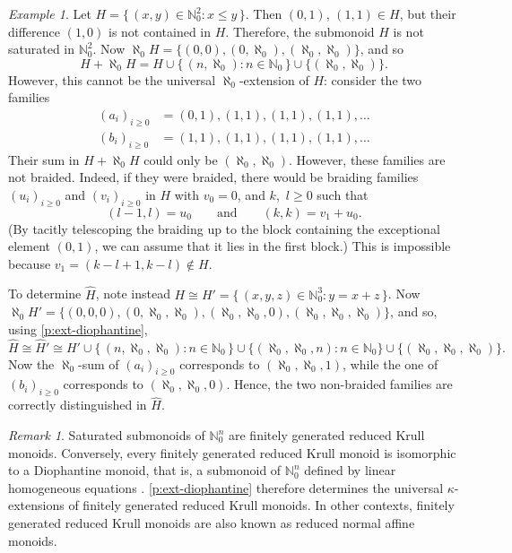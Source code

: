 \documentclass[a4paper,11pt,oneside]{amsart}
\theoremstyle{remark}
\newtheorem{remark}[teor]{Remark}
\newtheorem{example}[teor]{Example}
\newcommand{\bN}{\mathbb N}
\begin{document}
\begin{example} \label{e:diophantine-inequalities}
  Let $H = \{\, (x,y) \in \bN_0^2 : x \le y \,\}$.
  Then $(0,1)$, $(1,1) \in H$, but their difference $(1,0)$ is not contained in $H$.
  Therefore, the submonoid $H$ is not saturated in $\bN_0^2$.
  Now $\aleph_0 H = \{ (0,0), (0, \aleph_0), (\aleph_0, \aleph_0) \}$, and so
  \[
  H + \aleph_0 H = H \cup \{\, (n, \aleph_0) : n \in \bN_0 \,\} \cup \{ (\aleph_0, \aleph_0) \}.
  \]
  However, this cannot be the universal $\aleph_0$-extension of $H$:
  consider the two families
  \begin{align*}
  (a_i)_{i \ge 0} &= (0,1), (1,1), (1,1), (1,1), \dots \\
  (b_i)_{i \ge 0} &= (1,1), (1,1), (1,1), (1,1), \dots
  \end{align*}
  Their sum in $H + \aleph_0 H$ could only be $(\aleph_0, \aleph_0)$.
  However, these families are not braided. 
  Indeed, if they were braided, there would be braiding families $(u_i)_{i \ge 0}$ and $(v_i)_{i\ge 0}$ in $H$ with $v_0=0$, and $k$,~$l \ge 0$ such that
  \[
  (l-1, l) = u_0 \qquad\text{and}\qquad (k,k) = v_1 + u_0.
  \]
  (By tacitly telescoping the braiding up to the block containing the exceptional element $(0,1)$, we can assume that it lies in the first block.)
  This is impossible because $v_1 = (k-l+1, k-l) \not \in H$.

  To determine $\widehat H$, note instead $H \cong H' = \{\, (x,y,z) \in \bN_0^3 : y = x+z \,\}$.
  Now $\aleph_0 H' = \{ (0,0,0), (0,\aleph_0,\aleph_0), (\aleph_0,\aleph_0,0), (\aleph_0,\aleph_0,\aleph_0) \}$, and so, using \cref{p:ext-diophantine}, 
  \[
  \widehat H \cong \widehat H' \cong H' \cup \{\, (n,\aleph_0,\aleph_0) : n \in \bN_0 \,\} \cup \{ (\aleph_0,\aleph_0,n) : n \in \bN_0 \} \cup \{ (\aleph_0,\aleph_0,\aleph_0) \}.
  \]
  Now the $\aleph_0$-sum of $(a_i)_{i \ge 0}$ corresponds to $(\aleph_0,\aleph_0,1)$, while the one of $(b_i)_{i \ge 0}$ corresponds to $(\aleph_0,\aleph_0,0)$.
  Hence, the two non-braided families are correctly distinguished in $\widehat H$.
\end{example}

\begin{remark}
  Saturated submonoids of $\bN_0^n$ are finitely generated reduced Krull monoids.
  Conversely, every finitely generated reduced Krull monoid is isomorphic to a Diophantine monoid, that is, a submonoid of $\bN_0^n$ defined by linear homogeneous equations \cite[Theorem 3.1]{ChapmanKrauseOeljeklaus02}.
  \cref{p:ext-diophantine} therefore determines the universal $\kappa$-extensions of finitely generated reduced Krull monoids. In other contexts, finitely generated reduced Krull monoids are also known as reduced normal affine monoids.
\end{remark}
\end{document}
